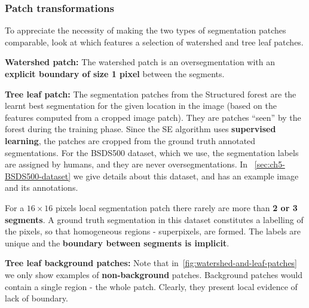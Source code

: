 \subsubsection{Patch transformations}
To appreciate the necessity of making the two types of segmentation patches comparable, look at  which features a selection of watershed and tree leaf patches.

\textbf{Watershed patch:} The watershed patch is an oversegmentation with an \textbf{explicit boundary of size 1 pixel} between the segments.

\textbf{Tree leaf patch:} The segmentation patches from the Structured forest are the learnt best segmentation for the given location in the image (based on the features computed from a cropped image patch). They are patches ``seen'' by the forest during the training phase. Since the SE algorithm uses \textbf{supervised learning}, the patches are cropped from the ground truth annotated segmentations. 
For the BSDS500 dataset, which we use, the segmentation labels  are assigned by humans, and they are never oversegmentations. In \textsection~\ref{sec:ch5-BSDS500-dataset} we give details about this dataset, and  has an example image and its annotations.

For a $16\times 16$ pixels local segmentation patch there rarely are more than \textbf{2 or 3 segments}. 
A ground truth segmentation in this dataset constitutes a labelling of the pixels, so that homogeneous regions - superpixels, are formed. The labels are unique and the \textbf{boundary between segments is implicit}.

\textbf{Tree leaf background patches:} Note that in~\ref{fig:watershed-and-leaf-patches} we only show examples of \textbf{non-background} patches. Background patches would contain a single region - the whole patch. Clearly, %
they present local evidence of lack of boundary.

